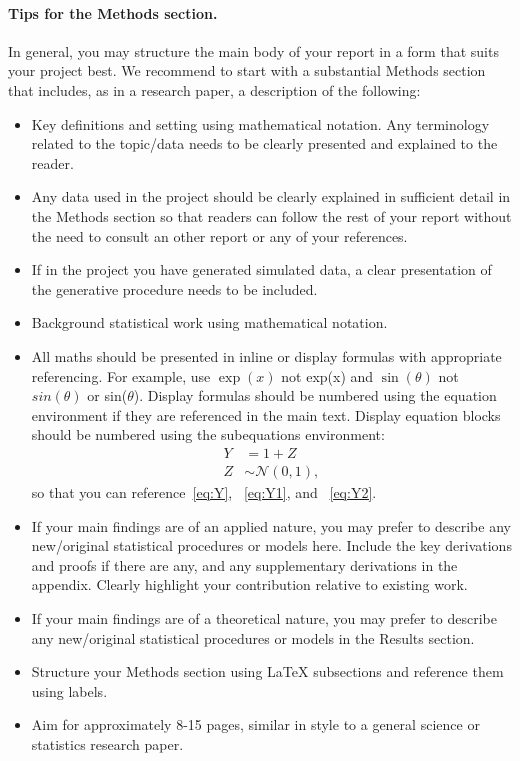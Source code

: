 \paragraph{Tips for the Methods section.} In general, you may structure the main body of your report in a form that suits your project best. We recommend to start with a substantial Methods section that includes, as in a research paper, a description of the following:
\begin{itemize}
    \item Key definitions and setting using mathematical notation. Any terminology related to the topic/data needs to be clearly presented and explained to the reader.
    \item Any data used in the project should be clearly explained in sufficient detail in the Methods section so that readers can follow the rest of your report without the need to consult an other report or any of your references.
    \item If in the project you have generated simulated data, a clear presentation of the generative procedure needs to be included. 
    \item Background statistical work using mathematical notation.
    \item All maths should be presented in inline or display formulas with appropriate referencing. For example, use $\exp(x)$ not exp(x) and $\sin(\theta)$ not $sin(\theta)$ or sin($\theta$). Display formulas should be numbered using the equation environment if they are referenced in the main text. Display equation blocks should be numbered using the subequations environment:
\begin{subequations}\label{eq:Y}
    \begin{align}
        Y & = 1 + Z \label{eq:Y1} \\ 
        Z & \sim \mathcal{N}(0,1) \label{eq:Y2},
    \end{align}
\end{subequations}
    so that you can reference~\eqref{eq:Y}, ~\eqref{eq:Y1}, and ~\eqref{eq:Y2}.
    \item If your main findings are of an applied nature, you may prefer to describe any new/original statistical procedures or models here. Include the key derivations and proofs if there are any, and any supplementary derivations in the appendix. Clearly highlight your contribution relative to existing work. 
    \item If your main findings are of a theoretical nature, you may prefer to describe any new/original statistical procedures or models in the Results section.
    \item Structure your Methods section using LaTeX   subsections and reference them using labels.
    \item Aim for approximately 8-15 pages, similar in style to a general science or statistics research paper.
\end{itemize}


